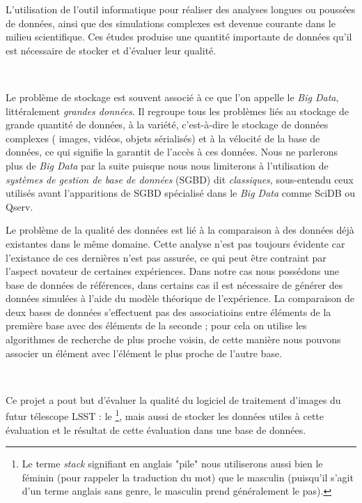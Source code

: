 
L'utilisation de l'outil informatique pour réaliser des analyses longues ou poussées de données, ainsi que des simulations complexes est devenue courante dans le milieu scientifique. Ces études produise une quantité importante de données qu'il est nécessaire de stocker et d'évaluer leur qualité.

\

Le problème de stockage est souvent associé à ce que l'on appelle le \emph{Big Data}, littéralement \emph{grandes données}. Il regroupe tous les problèmes liés au stockage de grande quantité de données, à la variété, c'est-à-dire le stockage de données complexes (\eg{} images, vidéos, objets sérialisés) et à la vélocité de la base de données, ce qui signifie la garantit de l'accès à ces données. Nous ne parlerons plus de \emph{Big Data} par la suite puisque nous nous limiterons à l'utilisation de \emph{systèmes de gestion de base de données} (SGBD) dit \emph{classiques}, sous-entendu ceux utilisés avant l'apparitions de SGBD spécialisé dans le \emph{Big Data} comme SciDB ou Qserv.

Le problème de la qualité des données est lié à la comparaison à des données déjà existantes dans le même domaine. Cette analyse n'est pas toujours évidente car l'existance de ces dernières n'est pas assurée, ce qui peut être contraint par l'aspect novateur de certaines expériences. Dans notre cas nous possédons une base de données de références, dans certains cas il est nécessaire de générer des données simulées à l'aide du modèle théorique de l'expérience. La comparaison de deux bases de données s'effectuent pas des associatioins entre éléments de la première base avec des éléments de la seconde ; pour cela on utilise les algorithmes de recherche de plus proche voisin, de cette manière nous pouvons associer un élément avec l'élément le plus proche de l'autre base.

\

Ce projet a pout but d'évaluer la qualité du logiciel de traitement d'images du futur télescope LSST : le \stack\footnote{Le terme \emph{stack} signifiant en anglais "pile" nous utiliserons aussi bien le féminin (pour rappeler la traduction du mot) que le masculin (puisqu'il s'agit d'un terme anglais sans genre, le masculin prend généralement le pas).}, mais aussi de stocker les données utiles à cette évaluation et le résultat de cette évaluation dans une base de données.

